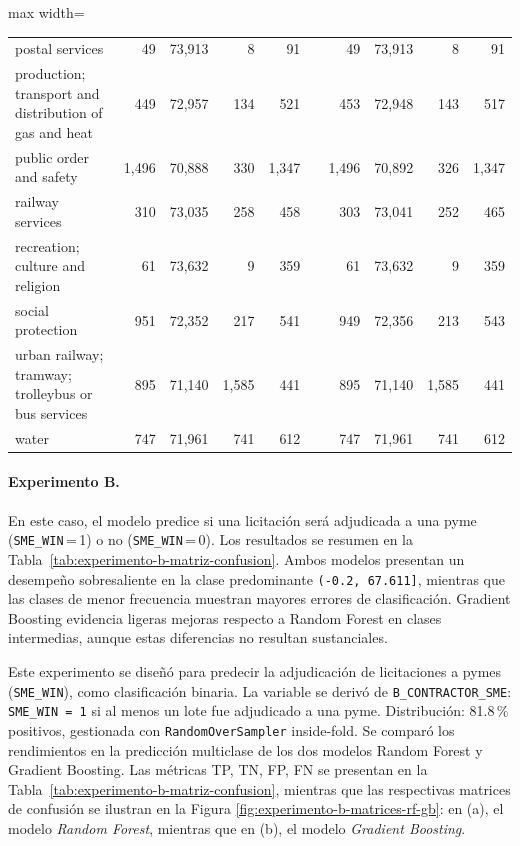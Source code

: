 \documentclass[a4paper,fleqn]{cas-sc}
\begin{document}
\begin{table}[t]
\begin{adjustbox}{max width=\textwidth}
\begin{tabular}{p{4cm}rrrrcrrrr}
			postal services & 49 & 73,913 & 8 & 91 & & 49 & 73,913 & 8 & 91 \\ 
			production; transport and distribution of gas and heat & 449 & 72,957 & 134 & 521 & & 453 & 72,948 & 143 & 517 \\ 
			public order and safety & 1,496 & 70,888 & 330 & 1,347 & & 1,496 & 70,892 & 326 & 1,347 \\ 
			railway services & 310 & 73,035 & 258 & 458 & & 303 & 73,041 & 252 & 465 \\ 
			recreation; culture and religion & 61 & 73,632 & 9 & 359 & & 61 & 73,632 & 9 & 359 \\ 
			social protection & 951 & 72,352 & 217 & 541 & & 949 & 72,356 & 213 & 543 \\ 
			urban railway; tramway; trolleybus or bus services & 895 & 71,140 & 1,585 & 441 & & 895 & 71,140 & 1,585 & 441 \\ 
			water & 747 & 71,961 & 741 & 612 & & 747 & 71,961 & 741 & 612 \\ 
			\hline
		\end{tabular}
	\end{adjustbox}		
\end{table}




\paragraph{\textbf{Experimento B.}}


	En este caso, el modelo predice si una licitación será adjudicada a una pyme (\texttt{SME\_WIN}\,=\,1) o no (\texttt{SME\_WIN}\,=\,0). Los resultados se resumen en la Tabla~\ref{tab:experimento-b-matriz-confusion}. Ambos modelos presentan un desempeño sobresaliente en la clase predominante \texttt{(-0.2, 67.611]}, mientras que las clases de menor frecuencia muestran mayores errores de clasificación. Gradient Boosting evidencia ligeras mejoras respecto a Random Forest en clases intermedias, aunque estas diferencias no resultan sustanciales.



Este experimento se diseñó para predecir la adjudicación de licitaciones a pymes (\texttt{SME\_WIN}), como clasificación binaria. La variable se derivó de \texttt{B\_CONTRACTOR\_SME}: \texttt{SME\_WIN\,=\,1} si al menos un lote fue adjudicado a una pyme. Distribución: 81.8\,\% positivos, gestionada con \texttt{RandomOverSampler} inside-fold. Se comparó los rendimientos en la predicción multiclase de los dos modelos Random Forest y Gradient Boosting. Las métricas TP, TN, FP, FN se presentan en la Tabla~\ref{tab:experimento-b-matriz-confusion}, mientras que las respectivas matrices de confusión se ilustran en la Figura \ref{fig:experimento-b-matrices-rf-gb}:
en (a), el modelo \textit{Random Forest}, mientras que en (b), el modelo \textit{Gradient Boosting}.
\end{document}
